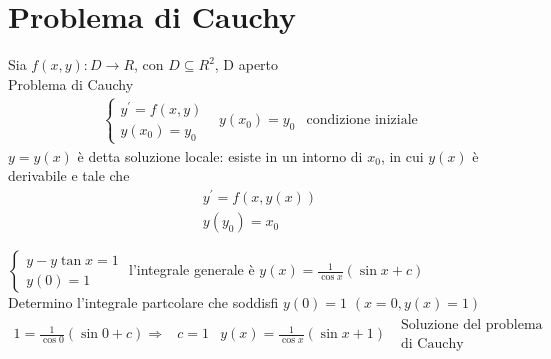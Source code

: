 \section{Problema di Cauchy \label{pcauchy}}
\begin{defi}
  Sia $f(x,y):D\to R$, con $D \subseteq R^2$, D aperto\\
  Problema di Cauchy
  \begin{eqnarray*}
    \begin{cases}
      y^\prime=f(x,y)\\
      y(x_0)=y_0
      \end{cases} & y(x_0)=y_0 &\text{condizione iniziale}
  \end{eqnarray*}
  $y=y(x)$ è detta {\color{red}soluzione locale}: esiste in un intorno di $x_0$, in cui
  $y(x)$ è derivabile e tale che
  \begin{eqnarray*}
    y^\prime=f(x,y(x))\\
    y(y_0)=x_0
  \end{eqnarray*}
\end{defi}
\begin{esempio}
  $\begin{cases}
     y-y\tan x=1\\
     y(0)=1
   \end{cases}$ l'integrale generale è $y(x)=\frac{1}{\cos x}(\sin x+c)$\\
   Determino l'integrale partcolare che soddisfi $y(0)=1$ $(x=0,y(x)=1)$
   \begin{eqnarray*}
     1=\frac{1}{\cos 0} (\sin 0 +c) \Rightarrow &c=1 & y(x)=\frac{1}{\cos x}(\sin x+1)
     \text{ } \begin{matrix}
         \text{Soluzione del problema}\\
         \text{di Cauchy}
       \end{matrix}
   \end{eqnarray*}
\end{esempio}
